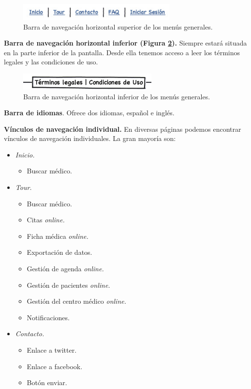 \documentclass[a4paper,oneside,11pt]{book}
\begin{document}
		\begin{figure}[H]
		  \centering
		    \includegraphics[width=8cm]{img/jpg/nav/general_sup.jpg}
		  \caption{Barra de navegación horizontal superior de los menús generales.}
		  \label{fig:nav_general_sup}
		\end{figure}
		
		\textbf{Barra de navegación horizontal inferior (Figura \ref{fig:nav_general_inf}).} Siempre estará situada en la parte inferior de la pantalla. Desde ella tenemos acceso a leer los términos legales y las condiciones de uso.
		
		\begin{figure}[H]
		  \centering
		    \includegraphics[width=7cm]{img/jpg/nav/general_inf.jpg}
		  \caption{Barra de navegación horizontal inferior de los menús generales.}
		  \label{fig:nav_general_inf}
		\end{figure}
		
		\textbf{Barra de idiomas}. Ofrece dos idiomas, español e inglés.
		
		\textbf{Vínculos de navegación individual.} En diversas páginas podemos encontrar vínculos de navegación individuales. La gran mayoría son:
		\begin{itemize}
			\item \textit{Inicio.}
				\begin{itemize}
					\item Buscar médico.
				\end{itemize}
			\item \textit{Tour.}
				\begin{itemize}
					\item Buscar médico.
					\item Citas \textit{online.}
					\item Ficha médica \textit{online.}
					\item Exportación de datos.
					\item Gestión de agenda \textit{online.}
					\item Gestión de pacientes \textit{online.}
					\item Gestión del centro médico \textit{online.}
					\item Notificaciones.
				\end{itemize}
			\item \textit{Contacto.}
				\begin{itemize}
					\item Enlace a twitter.
					\item Enlace a facebook.
					\item Botón enviar.
				\end{itemize}
		\end{itemize}
		
\end{document}
